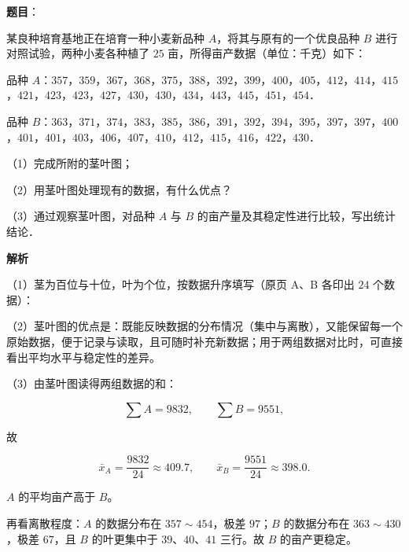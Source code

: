 \begin{answer}

\textbf{题目}：

某良种培育基地正在培育一种小麦新品种 $A$，将其与原有的一个优良品种 $B$ 进行对照试验，两种小麦各种植了 $25$ 亩，所得亩产数据（单位：千克）如下：

品种 $A$：$357$，$359$，$367$，$368$，$375$，$388$，$392$，$399$，$400$，$405$，$412$，$414$，$415$，$421$，$423$，$423$，$427$，$430$，$430$，$434$，$443$，$445$，$451$，$454$．

品种 $B$：$363$，$371$，$374$，$383$，$385$，$386$，$391$，$392$，$394$，$395$，$397$，$397$，$400$，$401$，$401$，$403$，$406$，$407$，$410$，$412$，$415$，$416$，$422$，$430$．

（1）完成所附的茎叶图；

（2）用茎叶图处理现有的数据，有什么优点？

（3）通过观察茎叶图，对品种 $A$ 与 $B$ 的亩产量及其稳定性进行比较，写出统计结论．
\nopagebreak[4]
\begin{center}\end{center}
\nopagebreak[4]
\textbf{解析}

（1）茎为百位与十位，叶为个位，按数据升序填写（原页 A、B 各印出 $24$ 个数据）：
\nopagebreak[4]
\begin{center}\end{center}
\nopagebreak[4]
（2）茎叶图的优点是：既能反映数据的分布情况（集中与离散），又能保留每一个原始数据，便于记录与读取，且可随时补充新数据；用于两组数据对比时，可直接看出平均水平与稳定性的差异。

（3）由茎叶图读得两组数据的和：

\nopagebreak[4]
\[\sum A=9832,\qquad \sum B=9551,\]

故

\nopagebreak[4]
\[\bar x_A=\frac{9832}{24}\approx409.7,\qquad \bar x_B=\frac{9551}{24}\approx398.0 .\]

$A$ 的平均亩产高于 $B$。

再看离散程度：$A$ 的数据分布在 $357\sim454$，极差 $97$；$B$ 的数据分布在 $363\sim430$，极差 $67$，且 $B$ 的叶更集中于 $39$、$40$、$41$ 三行。故 $B$ 的亩产更稳定。


\end{answer}
